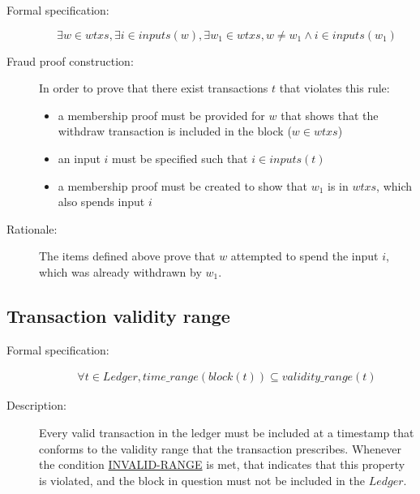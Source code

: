 \documentclass[../main.tex]{subfiles}
\begin{document}
\begin{description}

\item[Formal specification:]
\begin{equation*}
    \exists w \in wtxs, \exists i \in inputs(w), \exists w_1 \in wtxs, w \neq w_1 \land i \in inputs(w_1)
\end{equation*}

\item[Fraud proof construction:] In order to prove that there exist transactions $t$ that violates this rule:
\begin{itemize}
    \item a membership proof must be provided for $w$ that shows that the withdraw transaction is included in the block ($w \in wtxs$)
    \item an input $i$ must be specified such that $i \in inputs(t)$
    \item a membership proof must be created to show that $w_1$ is in $wtxs$, which also spends input $i$
\end{itemize}

\item[Rationale:] The items defined above prove that $w$ attempted to spend the input $i$, which was already withdrawn by $w_1$.

\end{description}

\subsection{Transaction validity range}

\begin{description}

\item[Formal specification:]
\begin{equation*}
\begin{split}
    \forall t \in Ledger, time\_range(block(t)) \subseteq validity\_range(t)
\end{split}
\end{equation*}

\item[Description:] Every valid transaction in the ledger must be included at a timestamp that conforms to the validity range that the transaction prescribes.
  Whenever the condition \hyperref[sec:INVALID-RANGE]{INVALID-RANGE} is met, that indicates that this property is violated, and the block in question must not be included in the $Ledger$.

\end{description}
\end{document}
